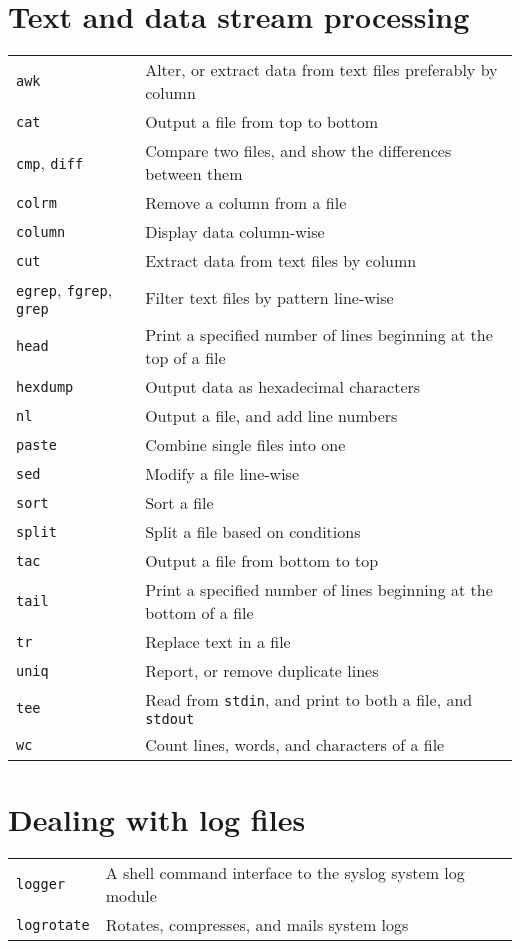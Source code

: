 \documentclass[10pt]{article}
\begin{document}
\begin{multicols}{2}
\section{Text and data stream processing}
\begin{tabular}{ p{2.5cm} p{8.5cm} }
  \hline
  \texttt{awk} & Alter, or extract data from text files preferably by column\\
  \rowcolor{Gray}
  \texttt{cat} & Output a file from top to bottom \\
  \texttt{cmp}, \texttt{diff} & Compare two files, and show the differences between them\\
  \rowcolor{Gray}
  \texttt{colrm} & Remove a column from a file \\
  \texttt{column} & Display data column-wise \\
  \rowcolor{Gray}
  \texttt{cut} & Extract data from text files by column \\
  \texttt{egrep}, \texttt{fgrep}, \texttt{grep} & Filter text files by pattern line-wise \\
  \rowcolor{Gray}
  \texttt{head} & Print a specified number of lines beginning at  the top of a file\\
  \texttt{hexdump} & Output data as hexadecimal characters\\
  \rowcolor{Gray}
  \texttt{nl} & Output a file, and add line numbers\\
  \texttt{paste} & Combine single files into one \\
  \rowcolor{Gray}
  \texttt{sed} & Modify a file line-wise \\
  \texttt{sort} & Sort a file \\
  \rowcolor{Gray}
  \texttt{split} & Split a file based on conditions\\
  \texttt{tac} & Output a file from bottom to top\\
  \rowcolor{Gray}
  \texttt{tail} & Print a specified number of lines beginning at the bottom of a file\\
  \texttt{tr} & Replace text in a file\\
  \rowcolor{Gray}
  \texttt{uniq} & Report, or remove duplicate lines \\
  \texttt{tee} & Read from \texttt{stdin}, and print to both a file, and \texttt{stdout}\\
  \rowcolor{Gray}
  \texttt{wc} & Count lines, words, and characters of a file\\
  \hline
\end{tabular}

\section{Dealing with log files}
\begin{tabular}{ p{2.5cm} p{8.5cm} }
  \hline
  \texttt{logger} & A shell command interface to the syslog system log module \\
  \rowcolor{Gray}
  \texttt{logrotate} & Rotates, compresses, and mails system logs \\
  \hline
\end{tabular}

\end{multicols}
\end{document}
